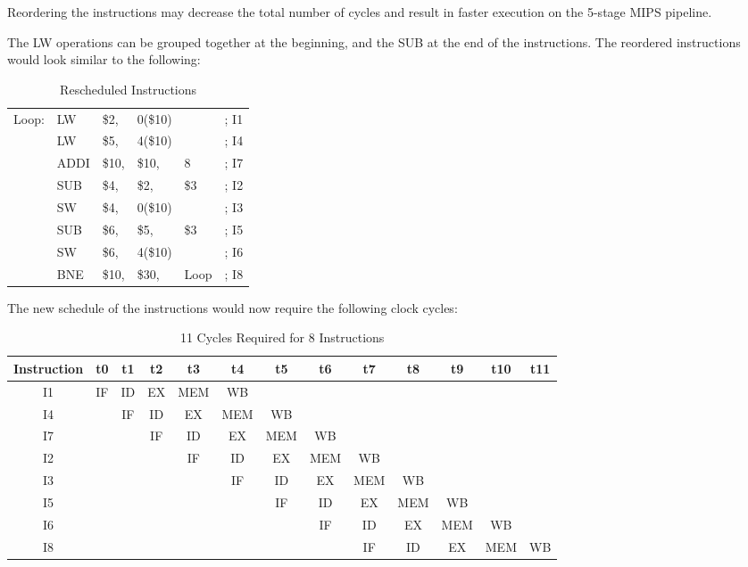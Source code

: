 \documentclass[paper=usletter, fontsize=12pt]{article}
\begin{document}
\begin{enumerate}
        Reordering the instructions may decrease the total number of cycles and result in faster execution on the 5-stage MIPS pipeline.

        The LW operations can be grouped together at the beginning, and the SUB at the end of the instructions. The reordered instructions would look similar to the following:

        \begin{table}[h]
            \caption{Rescheduled Instructions}
            \centering
            \begin{tabular*}{200pt}{@{\extracolsep{\fill}} llllll}
            Loop:   & LW & \$2, & 0(\$10) & & ; I1 \\
                    & LW & \$5, & 4(\$10) & & ; I4 \\
                    & ADDI & \$10, & \$10, & 8 & ; I7 \\
                    & SUB & \$4, & \$2, & \$3 & ; I2 \\
                    & SW & \$4, & 0(\$10) & & ; I3 \\
                    & SUB & \$6, & \$5, & \$3 & ; I5 \\
                    & SW & \$6, & 4(\$10) & & ; I6 \\
                    & BNE & \$10, & \$30, & Loop & ; I8 \\
            \end{tabular*}
        \end{table}

        The new schedule of the instructions would now require the following clock cycles:

        \begin{table}[h]
            \caption{11 Cycles Required for 8 Instructions}
            \centering
            \begin{tabular*}{500pt}{@{\extracolsep{\fill}} c|cccccccccccc}

            \textbf{Instruction} & \textbf{t0} & \textbf{t1} & \textbf{t2} & \textbf{t3} & \textbf{t4} & \textbf{t5} & \textbf{t6} & \textbf{t7} & \textbf{t8} & \textbf{t9} & \textbf{t10} & \textbf{t11} \\
            \hline
            I1 & IF & ID & EX & MEM & WB & & & & & & & \\
            I4 & & IF & ID & EX & MEM & WB & & & & & & \\
            I7 & & & IF & ID & EX & MEM & WB & & & & & \\
            I2 & & & & IF & ID & EX & MEM & WB & & & & \\
            I3 & & & & & IF & ID & EX & MEM & WB & & & \\
            I5 & & & & & & IF & ID & EX & MEM & WB & & \\
            I6 & & & & & & & IF & ID & EX & MEM & WB & \\
            I8 & & & & & & & & IF & ID & EX & MEM & WB \\
            \end{tabular*}
        \end{table}

    \end{enumerate}
\end{document}
